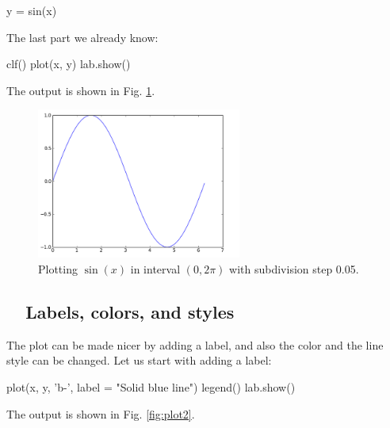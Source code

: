 \begin{bluecode}
y = sin(x)
\end{bluecode}
The last part we already know:

\begin{bluecode}
clf()
plot(x, y)
lab.show()
\end{bluecode}
\noindent
The output is shown in Fig. \ref{fig:plot1}.\\[-7mm]

\begin{figure}[!ht]
\begin{center}
\includegraphics[width=0.6\textwidth]{imgp/plot1.png}
\end{center}
\vspace{-6mm}
\caption{Plotting $\sin(x)$ in interval $(0, 2\pi)$ with subdivision step 0.05.}
\label{fig:plot1}
\vspace{-2mm}
\end{figure}
\noindent

\subsection{\ \ Labels, colors, and styles}

The plot can be made nicer by adding a label, and also the color 
and the line style can be changed. Let us start with adding a label:

\begin{bluecode}
plot(x, y, 'b-', label = "Solid blue line")
legend()
lab.show()
\end{bluecode}
The output is shown in Fig. \ref{fig:plot2}.\\[-7mm]

